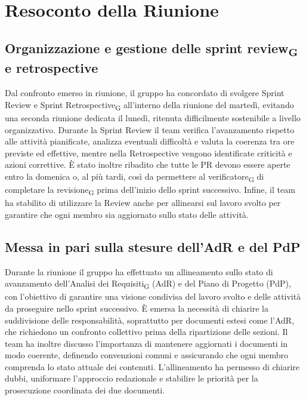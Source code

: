 \section{Resoconto della Riunione}
\subsection{Organizzazione e gestione delle sprint review\textsubscript{G} e retrospective}
Dal confronto emerso in riunione, il gruppo ha concordato
di svolgere Sprint Review e Sprint Retrospective\textsubscript{G} 
all’interno della riunione del martedì, evitando una 
seconda riunione dedicata il lunedì, ritenuta 
difficilmente sostenibile a livello organizzativo.
Durante la Sprint Review il team verifica 
l’avanzamento rispetto alle attività pianificate, 
analizza eventuali difficoltà e valuta la coerenza 
tra ore previste ed effettive, mentre nella Retrospective 
vengono identificate criticità e azioni correttive.
È stato inoltre ribadito che tutte le PR 
devono essere aperte entro la domenica o, al più tardi,
così da permettere al verificatore\textsubscript{G} di completare 
la revisione\textsubscript{G} prima dell’inizio dello sprint successivo. 
Infine, il team ha stabilito di utilizzare la Review 
anche per allinearsi sul lavoro svolto
per garantire che ogni membro sia aggiornato sullo 
stato delle attività.

\subsection{Messa in pari sulla stesure dell'AdR e del PdP}
Durante la riunione il gruppo ha effettuato un 
allineamento sullo stato di avanzamento 
dell’Analisi dei Requisiti\textsubscript{G} (AdR) e del Piano 
di Progetto (PdP), con l’obiettivo di garantire 
una visione condivisa del lavoro svolto e delle 
attività da proseguire nello sprint successivo. 
È emersa la necessità di chiarire la suddivisione 
delle responsabilità, soprattutto per documenti 
estesi come l’AdR, che richiedono un confronto 
collettivo prima della ripartizione delle sezioni. 
Il team ha inoltre discusso 
l’importanza di mantenere aggiornati i 
documenti in modo coerente, definendo convenzioni 
comuni e assicurando che ogni 
membro comprenda lo stato attuale dei contenuti. 
L’allineamento ha permesso di chiarire dubbi, 
uniformare l’approccio redazionale e stabilire le 
priorità per la prosecuzione coordinata dei due documenti.

